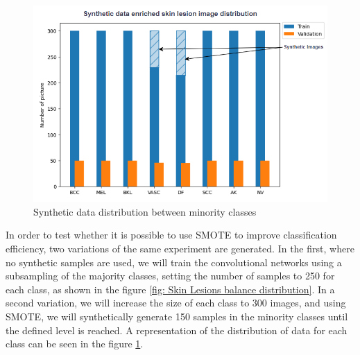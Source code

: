\begin{figure}[ht]
    \begin{center}
        \includegraphics[scale=0.6]{images/Building/SMOTE/synthetic_data_distribution.png}
        \caption{Synthetic data distribution between minority classes}
    \label{fig: Smote_data_representation}    
    \end{center}
\end{figure}

In order to test whether it is possible to use SMOTE to improve classification efficiency, two variations of the same experiment are generated. In the first, where no synthetic samples are used, we will train the convolutional networks using a subsampling of the majority classes, setting the number of samples to 250 for each class, as shown in the figure \ref{fig: Skin Lesions balance distribution}. In a second variation, we will increase the size of each class to 300 images, and using SMOTE, we will synthetically generate 150 samples in the minority classes until the defined level is reached. A representation of the distribution of data for each class can be seen in the figure \ref{fig: Smote_data_representation}.

